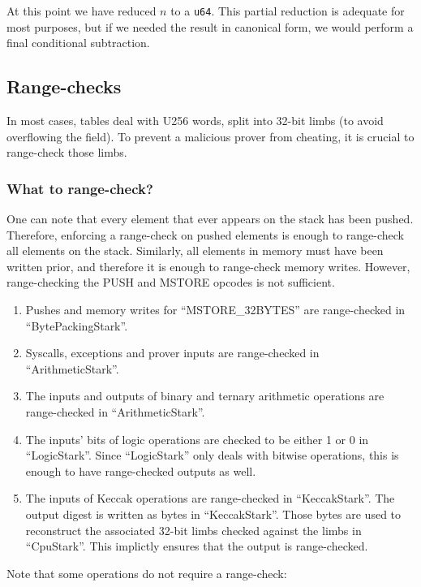 At this point we have reduced $n$ to a \texttt{u64}. This partial reduction is adequate for most purposes, but if we needed the result in canonical form, we would perform a final conditional subtraction.

\subsection{Range-checks}
\label{rc}
In most cases, tables deal with U256 words, split into 32-bit limbs (to avoid overflowing the field). To prevent a malicious prover from cheating, it is crucial to range-check those limbs. 
\subsubsection{What to range-check?}
One can note that every element that ever appears on the stack has been pushed. Therefore, enforcing a range-check on pushed elements is enough to range-check all elements on the stack. Similarly, all elements in memory must have been written prior, and therefore it is enough to range-check memory writes. However, range-checking the PUSH and MSTORE opcodes is not sufficient.
\begin{enumerate}
  \item Pushes and memory writes for ``MSTORE\_32BYTES'' are range-checked in ``BytePackingStark''.
  \item Syscalls, exceptions and prover inputs are range-checked in ``ArithmeticStark''.
  \item The inputs and outputs of binary and ternary arithmetic operations are range-checked in ``ArithmeticStark''.
  \item The inputs' bits of logic operations are checked to be either 1 or 0 in ``LogicStark''. Since ``LogicStark'' only deals with bitwise operations, this is enough to have range-checked outputs as well.
  \item The inputs of Keccak operations are range-checked in ``KeccakStark''. The output digest is written as bytes in ``KeccakStark''. Those bytes are used to reconstruct the associated 32-bit limbs checked against the limbs in ``CpuStark''. This implictly ensures that the output is range-checked.
\end{enumerate}
Note that some operations do not require a range-check:
